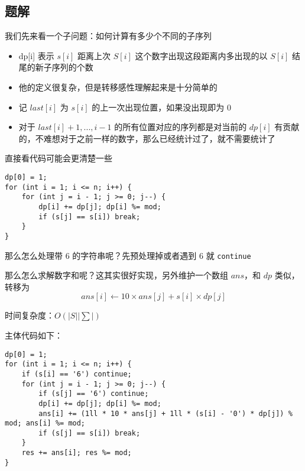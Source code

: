 \subsection{题解}
\begin{frame} %
我们先来看一个子问题：如何计算有多少个不同的子序列

\begin{itemize}
    \item dp[i] 表示 $s[i]$ 距离上次 $S[i]$ 这个数字出现这段距离内多出现的以 $S[i]$ 结尾的新子序列的个数
    \item 他的定义很复杂，但是转移感性理解起来是十分简单的
    \item 记 $last[i]$ 为 $s[i]$ 的上一次出现位置，如果没出现即为 $0$
    \item 对于 $last[i] + 1, ..., i - 1$ 的所有位置对应的序列都是对当前的 $dp[i]$ 有贡献的，不难想对于之前一样的数字，那么已经统计过了，就不需要统计了
\end{itemize}
\end{frame}

\begin{frame}[fragile]

\begin{minipage}{0.8\textwidth}

直接看代码可能会更清楚一些

\begin{lstlisting}[style=C++]
dp[0] = 1;
for (int i = 1; i <= n; i++) {
    for (int j = i - 1; j >= 0; j--) {
        dp[i] += dp[j]; dp[i] %= mod;
        if (s[j] == s[i]) break;
    }
}
\end{lstlisting}
那么怎么处理带 $6$ 的字符串呢？先预处理掉或者遇到 $6$ 就 \texttt{continue}

\end{minipage}

\end{frame}

\begin{frame}
那么怎么求解数字和呢？这其实很好实现，另外维护一个数组 $ans$，和 $dp$ 类似，转移为
$$
ans[i]\leftarrow 10\times ans[j] + s[i]\times dp[j]
$$

时间复杂度：$O(|S||\sum|)$
\end{frame}

\begin{frame}[fragile]
\begin{minipage}{0.8\textwidth}

主体代码如下：
\begin{lstlisting}[style=C++]
dp[0] = 1;
for (int i = 1; i <= n; i++) {
    if (s[i] == '6') continue;
    for (int j = i - 1; j >= 0; j--) {
        if (s[j] == '6') continue;
        dp[i] += dp[j]; dp[i] %= mod;
        ans[i] += (1ll * 10 * ans[j] + 1ll * (s[i] - '0') * dp[j]) % mod; ans[i] %= mod;
        if (s[j] == s[i]) break;
    }
    res += ans[i]; res %= mod;
}
\end{lstlisting}

\end{minipage}
\end{frame}
